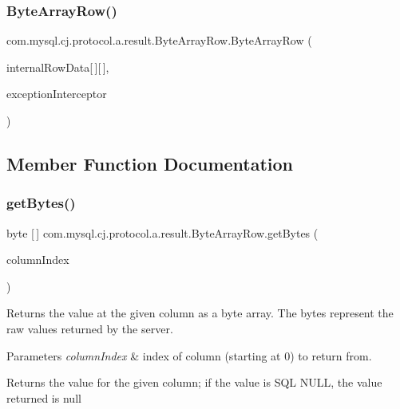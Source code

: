 \subsubsection{\texorpdfstring{Byte\+Array\+Row()}{ByteArrayRow()}\hspace{0.1cm}{\footnotesize\ttfamily [2/2]}}
{\footnotesize\ttfamily com.\+mysql.\+cj.\+protocol.\+a.\+result.\+Byte\+Array\+Row.\+Byte\+Array\+Row (\begin{DoxyParamCaption}\item[{byte}]{internal\+Row\+Data\mbox{[}$\,$\mbox{]}\mbox{[}$\,$\mbox{]},  }\item[{\mbox{\hyperlink{interfacecom_1_1mysql_1_1cj_1_1exceptions_1_1_exception_interceptor}{Exception\+Interceptor}}}]{exception\+Interceptor }\end{DoxyParamCaption})}



\subsection{Member Function Documentation}
\mbox{\label{classcom_1_1mysql_1_1cj_1_1protocol_1_1a_1_1result_1_1_byte_array_row_a51fcdd0efd6909d54dc395077c800768}} 
\subsubsection{\texorpdfstring{get\+Bytes()}{getBytes()}}
{\footnotesize\ttfamily byte \mbox{[}$\,$\mbox{]} com.\+mysql.\+cj.\+protocol.\+a.\+result.\+Byte\+Array\+Row.\+get\+Bytes (\begin{DoxyParamCaption}\item[{int}]{column\+Index }\end{DoxyParamCaption})}

Returns the value at the given column as a byte array. The bytes represent the raw values returned by the server.


\begin{DoxyParams}{Parameters}
{\em column\+Index} & index of column (starting at 0) to return from. \\
\hline
\end{DoxyParams}
\begin{DoxyReturn}{Returns}
the value for the given column; if the value is S\+QL {\ttfamily N\+U\+LL}, the value returned is {\ttfamily null} 
\end{DoxyReturn}



